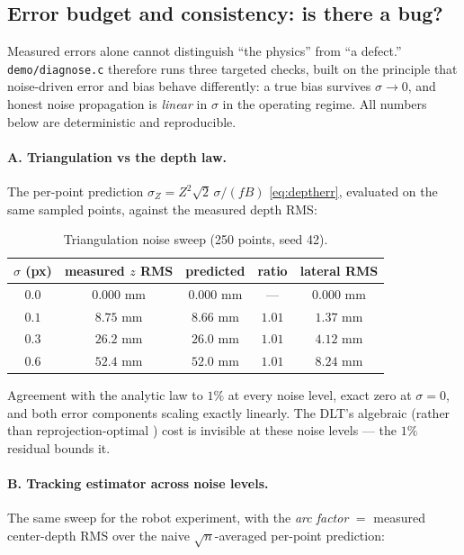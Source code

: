 \documentclass[11pt]{article}
\theoremstyle{definition}
\newcommand{\code}[1]{\texttt{#1}}
\begin{document}
\subsection{Error budget and consistency: is there a bug?}
\label{sec:budget}

Measured errors alone cannot distinguish ``the physics'' from ``a
defect.'' \code{demo/diagnose.c} therefore runs three targeted checks,
built on the principle that noise-driven error and bias behave
differently: a true bias survives $\sigma\to0$, and honest noise
propagation is \emph{linear} in $\sigma$ in the operating regime. All
numbers below are deterministic and reproducible.

\paragraph{A. Triangulation vs the depth law.} The per-point prediction
$\sigma_Z = Z^2\sqrt2\,\sigma/(fB)$ \eqref{eq:deptherr}, evaluated on the
same sampled points, against the measured depth RMS:

\begin{table}[ht]
\centering
\begin{tabular}{ccccc}
\toprule
$\sigma$ (px) & measured $z$ RMS & predicted & ratio & lateral RMS \\
\midrule
$0.0$ & $0.000$ mm  & $0.000$ mm  & ---    & $0.000$ mm \\
$0.1$ & $8.75$ mm   & $8.66$ mm   & $1.01$ & $1.37$ mm \\
$0.3$ & $26.2$ mm   & $26.0$ mm   & $1.01$ & $4.12$ mm \\
$0.6$ & $52.4$ mm   & $52.0$ mm   & $1.01$ & $8.24$ mm \\
\bottomrule
\end{tabular}
\caption{Triangulation noise sweep (250 points, seed 42).}
\label{tab:diagtri}
\end{table}

Agreement with the analytic law to $1\%$ at every noise level, exact zero
at $\sigma=0$, and both error components scaling exactly linearly. The
DLT's algebraic (rather than reprojection-optimal
\cite{HartleySturm1997}) cost is invisible at these noise levels ---
the $1\%$ residual bounds it.

\paragraph{B. Tracking estimator across noise levels.} The same sweep for
the robot experiment, with the \emph{arc factor} $=$ measured center-depth
RMS over the naive $\sqrt{n}$-averaged per-point prediction:
\end{document}
